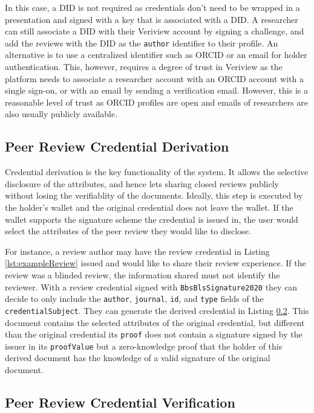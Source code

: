 In this case, a \acrshort{DID} is not required as credentials don't need to be wrapped in a presentation and signed with a key that is associated with a \acrshort{DID}. A researcher can still associate a \acrshort{DID} with their Veriview account by signing a challenge, and add the reviews with the \acrshort{DID} as the \lstinline{author} identifier to their profile. An alternative is to use a centralized identifier such as \acrshort{ORCID} or an email for holder authentication. This, however, requires a degree of trust in Veriview as the platform needs to associate a researcher account with an \acrshort{ORCID} account with a single sign-on, or with an email by sending a verification email. However, this is a reasonable level of trust as \acrshort{ORCID} profiles are open and emails of researchers are also usually publicly available.

\subsection{Peer Review Credential Derivation}

Credential derivation is the key functionality of the system. It allows the selective disclosure of the attributes, and hence lets sharing closed reviews publicly without losing the verifiablity of the documents. Ideally, this step is executed by the holder's wallet and the original credential does not leave the wallet. If the wallet supports the signature scheme the credential is issued in, the user would select the attributes of the peer review they would like to disclose. 

For instance, a review author may have the review credential in Listing \ref{lst:exampleReview} issued and would like to share their review experience. If the review was a blinded review, the information shared must not identify the reviewer. With a review credential signed with \lstinline{BbsBlsSignature2020} they can decide to only include the \lstinline{author}, \lstinline{journal}, \lstinline{id}, and \lstinline{type} fields of the \lstinline{credentialSubject}. They can generate the derived credential in Listing \ref{}. This document contains the selected attributes of the original credential, but different than the original credential its \lstinline{proof} does not contain a signature signed by the issuer in its \lstinline{proofValue} but a zero-knowledge proof that the holder of this derived document has the knowledge of a valid signature of the original document.


\subsection{Peer Review Credential Verification}

